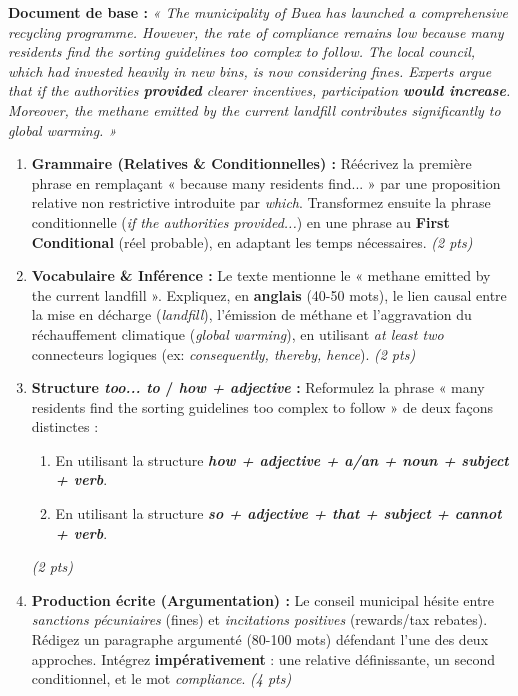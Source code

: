 \documentclass[11pt]{article}
\begin{document}
\begin{exercice}
\textbf{Document de base :} \textit{« The municipality of Buea has launched a comprehensive recycling programme. However, the rate of compliance remains low because many residents find the sorting guidelines too complex to follow. The local council, which had invested heavily in new bins, is now considering fines. Experts argue that if the authorities \textbf{provided} clearer incentives, participation \textbf{would increase}. Moreover, the methane emitted by the current landfill contributes significantly to global warming. »}

\begin{enumerate}
    \item \textbf{Grammaire (Relatives \& Conditionnelles) :} Réécrivez la première phrase en remplaçant « because many residents find... » par une proposition relative non restrictive introduite par \textit{which}. Transformez ensuite la phrase conditionnelle (\textit{if the authorities provided...}) en une phrase au \textbf{First Conditional} (réel probable), en adaptant les temps nécessaires. \textit{(2 pts)}
    \item \textbf{Vocabulaire \& Inférence :} Le texte mentionne le « methane emitted by the current landfill ». Expliquez, en \textbf{anglais} (40-50 mots), le lien causal entre la mise en décharge (\textit{landfill}), l'émission de méthane et l'aggravation du réchauffement climatique (\textit{global warming}), en utilisant \textit{at least two} connecteurs logiques (ex: \textit{consequently, thereby, hence}). \textit{(2 pts)}
    \item \textbf{Structure \textit{too... to} / \textit{how + adjective} :} Reformulez la phrase « many residents find the sorting guidelines too complex to follow » de deux façons distinctes :
    \begin{enumerate}
        \item En utilisant la structure \textbf{\textit{how + adjective + a/an + noun + subject + verb}}.
        \item En utilisant la structure \textbf{\textit{so + adjective + that + subject + cannot + verb}}.
    \end{enumerate}
    \textit{(2 pts)}
    \item \textbf{Production écrite (Argumentation) :} Le conseil municipal hésite entre \textit{sanctions pécuniaires} (fines) et \textit{incitations positives} (rewards/tax rebates). Rédigez un paragraphe argumenté (80-100 mots) défendant l'une des deux approches. Intégrez \textbf{impérativement} : une relative définissante, un second conditionnel, et le mot \textit{compliance}. \textit{(4 pts)}
\end{enumerate}
\end{exercice}
\end{document}

